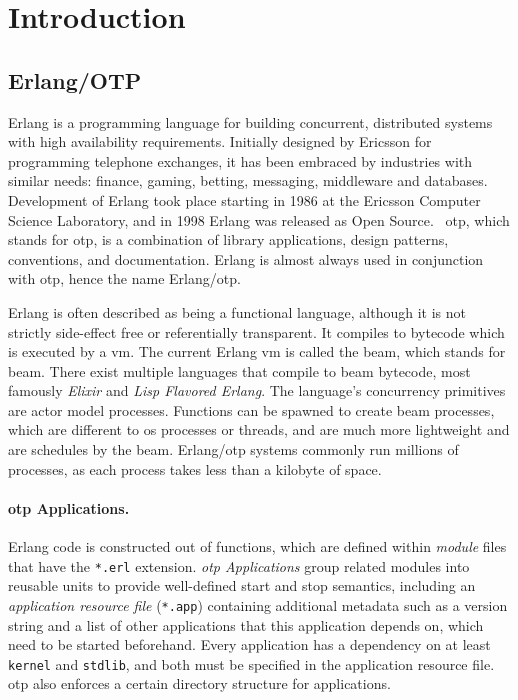 \section{Introduction}

\subsection{Erlang/OTP}

Erlang is a programming language for building concurrent, distributed systems with high availability requirements. Initially designed by Ericsson for programming telephone exchanges, it has been embraced by industries with similar needs: finance, gaming, betting, messaging, middleware and databases. Development of Erlang took place starting in 1986 at the Ericsson Computer Science Laboratory, and in 1998 Erlang was released as Open Source.~\cite{armstrong2007history} \acrshort{otp}, which stands for \acrlong{otp}, is a combination of library applications, design patterns, conventions, and documentation. Erlang is almost always used in conjunction with \acrshort{otp}, hence the name Erlang/\acrshort{otp}.

Erlang is often described as being a functional language, although it is not strictly side-effect free or referentially transparent. It compiles to bytecode which is executed by a \acrfull{vm}. The current Erlang \acrshort{vm} is called the \acrshort{beam}, which stands for \acrlong{beam}. There exist multiple languages that compile to \acrshort{beam} bytecode, most famously \emph{Elixir} and \emph{Lisp Flavored Erlang}. The language's concurrency primitives are actor model processes. Functions can be spawned to create \acrshort{beam} processes, which are different to \acrshort{os} processes or threads, and are much more lightweight and are schedules by the \acrshort{beam}. Erlang/\acrshort{otp} systems commonly run millions of processes, as each process takes less than a kilobyte of space.~\cite{larson}

\paragraph{\acrshort{otp} Applications.}
Erlang code is constructed out of functions, which are defined within \emph{module} files that have the \lstinline|*.erl| extension. \emph{\acrshort{otp} Applications} group related modules into reusable units to provide well-defined start and stop semantics, including an \emph{application resource file} (\lstinline|*.app|) containing additional metadata such as a version string and a list of other applications that this application depends on, which need to be started beforehand. Every application has a dependency on at least \lstinline|kernel| and \lstinline|stdlib|, and both must be specified in the application resource file. \acrshort{otp} also enforces a certain directory structure for applications.

